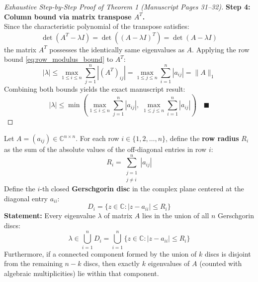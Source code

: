 \begin{proof}[Exhaustive Step-by-Step Proof of Theorem 1 (Manuscript Pages 31--32)]
\noindent\textbf{Step 4: Column bound via matrix transpose $A^T$.} \\
Since the characteristic polynomial of the transpose satisfies:
\begin{equation}
    \det(A^T - \lambda I) = \det\left( (A - \lambda I)^T \right) = \det(A - \lambda I)
\end{equation}
the matrix $A^T$ possesses the identically same eigenvalues as $A$. Applying the row bound \eqref{eq:row_modulus_bound} to $A^T$:
\begin{equation}
    |\lambda| \le \max_{1 \le i \le n} \sum_{j=1}^n |(A^T)_{ij}| = \max_{1 \le j \le n} \sum_{i=1}^n |a_{ij}| = \|A\|_1
\end{equation}
Combining both bounds yields the exact manuscript result:
\begin{equation}
    \boxed{|\lambda| \le \min\left( \max_{1 \le i \le n} \sum_{j=1}^n |a_{ij}|, \; \max_{1 \le j \le n} \sum_{i=1}^n |a_{ij}| \right)} \quad \blacksquare
\end{equation}
\end{proof}

\begin{theorembox}
Let $A = (a_{ij}) \in \mathbb{C}^{n \times n}$. For each row $i \in \{1, 2, \dots, n\}$, define the \textbf{row radius} $R_i$ as the sum of the absolute values of the off-diagonal entries in row $i$:
\begin{equation}
    R_i = \sum_{\substack{j=1 \\ j \ne i}}^n |a_{ij}|
\end{equation}
Define the $i$-th closed \textbf{Gerschgorin disc} in the complex plane centered at the diagonal entry $a_{ii}$:
\begin{equation}
    D_i = \big\{ z \in \mathbb{C} : |z - a_{ii}| \le R_i \big\}
\end{equation}
\textbf{Statement:} Every eigenvalue $\lambda$ of matrix $A$ lies in the union of all $n$ Gerschgorin discs:
\begin{equation}
    \boxed{\lambda \in \bigcup_{i=1}^n D_i = \bigcup_{i=1}^n \big\{ z \in \mathbb{C} : |z - a_{ii}| \le R_i \big\}}
\end{equation}
Furthermore, if a connected component formed by the union of $k$ discs is disjoint from the remaining $n - k$ discs, then exactly $k$ eigenvalues of $A$ (counted with algebraic multiplicities) lie within that component.
\end{theorembox}

